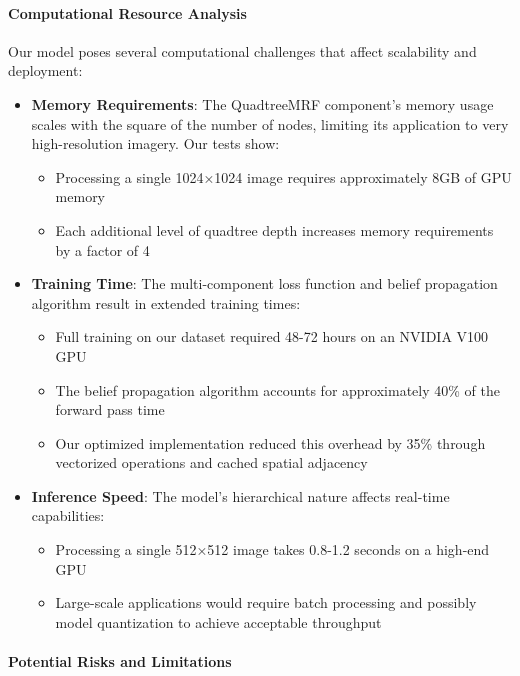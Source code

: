 \documentclass[conference]{IEEEtran}
\begin{document}
\paragraph{Computational Resource Analysis}

Our model poses several computational challenges that affect scalability and deployment:

\begin{itemize}
    \item \textbf{Memory Requirements}: The QuadtreeMRF component's memory usage scales with the square of the number of nodes, limiting its application to very high-resolution imagery. Our tests show:
    \begin{itemize}
        \item Processing a single 1024×1024 image requires approximately 8GB of GPU memory
        \item Each additional level of quadtree depth increases memory requirements by a factor of 4
    \end{itemize}
    
    \item \textbf{Training Time}: The multi-component loss function and belief propagation algorithm result in extended training times:
    \begin{itemize}
        \item Full training on our dataset required 48-72 hours on an NVIDIA V100 GPU
        \item The belief propagation algorithm accounts for approximately 40\% of the forward pass time
        \item Our optimized implementation reduced this overhead by 35\% through vectorized operations and cached spatial adjacency
    \end{itemize}
    
    \item \textbf{Inference Speed}: The model's hierarchical nature affects real-time capabilities:
    \begin{itemize}
        \item Processing a single 512×512 image takes 0.8-1.2 seconds on a high-end GPU
        \item Large-scale applications would require batch processing and possibly model quantization to achieve acceptable throughput
    \end{itemize}
\end{itemize}

\paragraph{Potential Risks and Limitations}
\end{document}
